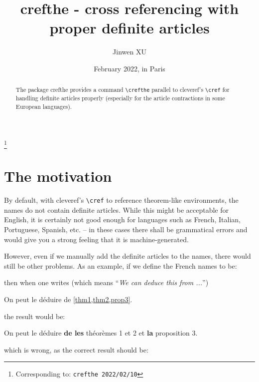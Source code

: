 \documentclass[classical]{einfart}
\newenvironment{demo}{%
    \LocallyStopLineNumbers%
    \begin{tcolorbox}[enhanced jigsaw,pad at break*=1mm,breakable,
        left=4mm,right=4mm,top=0.5mm,bottom=0mm,
        colback=gray!5!paper,boxrule=0pt,frame hidden,
        borderline west={1.5mm}{0mm}{gray!55!paper},arc=.7mm]%
}{\end{tcolorbox}\ResumeLineNumbers}
\newcommand{\crefthepackage}{\textsf{crefthe}}
\begin{document}
\title{\crefthepackage{} - cross referencing with proper definite articles}
\author{Jinwen XU}
\thanks{Corresponding to: \texttt{\crefthepackage{} 2022/02/10}}
\date{February 2022, in Paris}

\maketitle

\begin{abstract}
    \raggedleft
    The package \crefthepackage{} provides a command \lstinline|\crefthe| parallel to \textsf{cleveref}'s \lstinline|\cref| for handling definite articles properly (especially for the article contractions in some European languages).
\end{abstract}

\section{The motivation}

By default, with \textsf{cleveref}'s \lstinline|\cref| to reference theorem-like environments, the names do not contain definite articles. While this might be acceptable for English, it is certainly not good enough for languages such as French, Italian, Portuguese, Spanish, etc. -- in these cases there shall be grammatical errors and would give you a strong feeling that it is machine-generated.

However, even if we manually add the definite articles to the names, there would still be other problems. As an example, if we define the French names to be:

\begin{code}
\end{code}

then when one writes (which means ``\emph{We can deduce this from ...}'')

\begin{code}
On peut le déduire de \cref{thm1,thm2,prop3}.
\end{code}

the result would be:

\begin{demo}
    On peut le déduire \textbf{de les} théorèmes 1 et 2 et \textbf{la} proposition 3.
\end{demo}

which is wrong, as the correct result should be:
\end{document}
